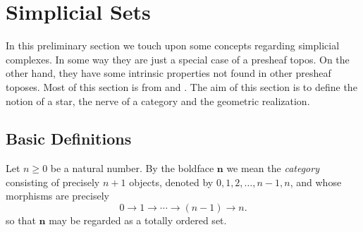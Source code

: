 %
%

\chapter{Simplicial Sets}

In this preliminary section we touch upon some concepts regarding simplicial complexes. In some way they are just a special case of a presheaf topos. On the other hand, they have some intrinsic properties not found in other presheaf toposes. Most of this section is from \cite{goersjardinne09} and \cite{JT2008}. The aim of this section is to define the notion of a star, the nerve of a category and the geometric realization.

\section{Basic Definitions}

\begin{definition}
\label{def: finite cardinal}
Let $n \geq 0$ be a natural number. By the boldface $\mathbf{n}$ we mean the \emph{category} consisting of precisely $n+1$ objects, denoted by $0,1,2,\ldots,n-1,n$, and whose morphisms are precisely
\[ 0 \to 1 \to \cdots \to (n-1) \to n. \]
so that $\mathbf{n}$ may be regarded as a totally ordered set.
\end{definition}

